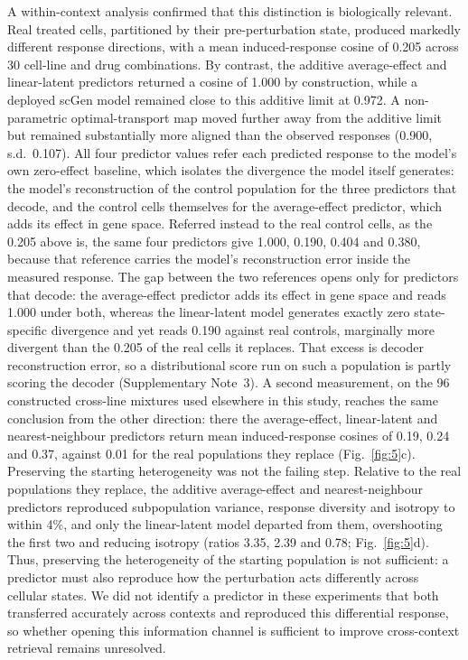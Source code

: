 \documentclass[11pt,letterpaper]{article}
\begin{document}
A within-context analysis confirmed that this distinction is biologically relevant. Real treated cells, partitioned by their pre-perturbation state, produced markedly different response directions, with a mean induced-response cosine of 0.205 across 30 cell-line and drug combinations. By contrast, the additive average-effect and linear-latent predictors returned a cosine of 1.000 by construction, while a deployed scGen model\cite{ref4} remained close to this additive limit at 0.972. A non-parametric optimal-transport map\cite{Sinkhorn,CellOT} moved further away from the additive limit but remained substantially more aligned than the observed responses (0.900, s.d.\ 0.107). All four predictor values refer each predicted response to the model's own zero-effect baseline, which isolates the divergence the model itself generates: the model's reconstruction of the control population for the three predictors that decode, and the control cells themselves for the average-effect predictor, which adds its effect in gene space. Referred instead to the real control cells, as the 0.205 above is, the same four predictors give 1.000, 0.190, 0.404 and 0.380, because that reference carries the model's reconstruction error inside the measured response. The gap between the two references opens only for predictors that decode: the average-effect predictor adds its effect in gene space and reads 1.000 under both, whereas the linear-latent model generates exactly zero state-specific divergence and yet reads 0.190 against real controls, marginally more divergent than the 0.205 of the real cells it replaces. That excess is decoder reconstruction error, so a distributional score run on such a population is partly scoring the decoder (Supplementary Note~3). A second measurement, on the 96 constructed cross-line mixtures used elsewhere in this study, reaches the same conclusion from the other direction: there the average-effect, linear-latent and nearest-neighbour predictors return mean induced-response cosines of 0.19, 0.24 and 0.37, against 0.01 for the real populations they replace (Fig.~\ref{fig:5}c). Preserving the starting heterogeneity was not the failing step. Relative to the real populations they replace, the additive average-effect and nearest-neighbour predictors reproduced subpopulation variance, response diversity and isotropy to within 4\%, and only the linear-latent model departed from them, overshooting the first two and reducing isotropy (ratios 3.35, 2.39 and 0.78; Fig.~\ref{fig:5}d). Thus, preserving the heterogeneity of the starting population is not sufficient: a predictor must also reproduce how the perturbation acts differently across cellular states. We did not identify a predictor in these experiments that both transferred accurately across contexts and reproduced this differential response, so whether opening this information channel is sufficient to improve cross-context retrieval remains unresolved.
\end{document}
